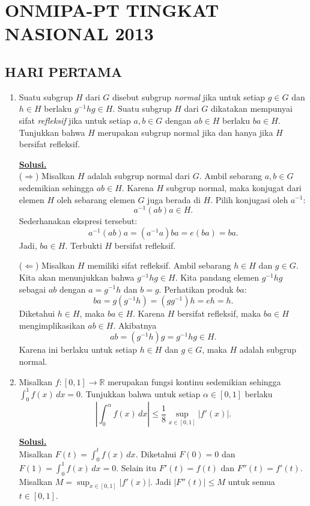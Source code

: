 \documentclass[12pt,twoside]{article}
\newenvironment{solution}
{
	\par\noindent\textbf{\underline{Solusi.}}\\
}
{
	\par
}
\begin{document}
\section{ONMIPA-PT TINGKAT NASIONAL 2013}
\subsection{HARI PERTAMA}
\begin{enumerate}
  \item Suatu subgrup $H$ dari $G$ disebut subgrup \textit{normal} jika untuk setiap $g\in G$ dan $h\in H$ berlaku $g^{-1}hg\in H$. Suatu subgrup $H$  dari $G$ dikatakan mempunyai sifat \textit{refleksif} jika untuk setiap $a,b\in G$ dengan $ab\in H$ berlaku $ba\in H$. Tunjukkan bahwa $H$ merupakan subgrup normal jika dan hanya jika $H$ bersifat refleksif.
        \begin{solution}
          ($\Rightarrow$) Misalkan $H$ adalah subgrup normal dari $G$.
          Ambil sebarang $a,b \in G$ sedemikian sehingga $ab \in H$.
          Karena $H$ subgrup normal, maka konjugat dari elemen $H$ oleh sebarang elemen $G$ juga berada di $H$.
          Pilih konjugasi oleh $a^{-1}$:
          \[ a^{-1}(ab)a \in H. \]
          Sederhanakan ekspresi tersebut:
          \[ a^{-1}(ab)a = (a^{-1}a)ba = e(ba) = ba. \]
          Jadi, $ba \in H$. Terbukti $H$ bersifat refleksif.

          ($\Leftarrow$) Misalkan $H$ memiliki sifat refleksif.
          Ambil sebarang $h \in H$ dan $g \in G$. Kita akan menunjukkan bahwa $g^{-1}hg \in H$.
          Kita pandang elemen $g^{-1}hg$ sebagai $ab$ dengan $a=g^{-1}h$ dan $b=g$.
          Perhatikan produk $ba$:
          \[ ba = g(g^{-1}h) = (gg^{-1})h = eh = h. \]
          Diketahui $h \in H$, maka $ba \in H$.
          Karena $H$ bersifat refleksif, maka $ba \in H$ mengimplikasikan $ab \in H$.
          Akibatnya
          \[ ab = (g^{-1}h)g = g^{-1}hg \in H. \]
          Karena ini berlaku untuk setiap $h \in H$ dan $g \in G$, maka $H$ adalah subgrup normal.
        \end{solution}


  \item Misalkan $f:[0,1]\to\mathbb{R}$ merupakan fungsi kontinu sedemikian sehingga $\displaystyle\int_{0}^{1}f(x)\,dx=0$. Tunjukkan bahwa untuk setiap $\alpha\in[0,1]$ berlaku
        $$\left|\int_{0}^{\alpha}f(x)\,dx\right|\leq \dfrac{1}{8}\sup_{x\in[0,1]}|f'(x)|.$$
        \begin{solution}
          Misalkan $F(t) = \int_0^t f(x) \, dx$.
          Diketahui $F(0) = 0$ dan $F(1) = \int_0^1 f(x) \, dx = 0$.
          Selain itu $F'(t) = f(t)$ dan $F''(t) = f'(t)$.
          Misalkan $M = \sup_{x\in[0,1]} |f'(x)|$. Jadi $|F''(t)| \le M$ untuk semua $t \in [0,1]$.


\end{solution}
\end{enumerate}
\end{document}
